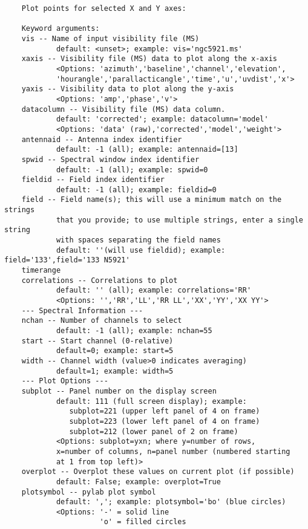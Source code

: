 \vspace{3mm}
\small
\begin{verbatim}
    Plot points for selected X and Y axes:
    
    Keyword arguments:
    vis -- Name of input visibility file (MS)
            default: <unset>; example: vis='ngc5921.ms'
    xaxis -- Visibility file (MS) data to plot along the x-axis
            <Options: 'azimuth','baseline','channel','elevation',
            'hourangle','parallacticangle','time','u','uvdist','x'>
    yaxis -- Visibility data to plot along the y-axis
            <Options: 'amp','phase','v'>
    datacolumn -- Visibility file (MS) data column.
            default: 'corrected'; example: datacolumn='model'
            <Options: 'data' (raw),'corrected','model','weight'>
    antennaid -- Antenna index identifier
            default: -1 (all); example: antennaid=[13]
    spwid -- Spectral window index identifier
            default: -1 (all); example: spwid=0
    fieldid -- Field index identifier
            default: -1 (all); example: fieldid=0
    field -- Field name(s); this will use a minimum match on the strings
            that you provide; to use multiple strings, enter a single string
            with spaces separating the field names
            default: ''(will use fieldid); example: field='133',field='133 N5921'
    timerange
    correlations -- Correlations to plot
            default: '' (all); example: correlations='RR'
            <Options: '','RR','LL','RR LL','XX','YY','XX YY'>
    --- Spectral Information ---
    nchan -- Number of channels to select
            default: -1 (all); example: nchan=55
    start -- Start channel (0-relative)
            default=0; example: start=5
    width -- Channel width (value>0 indicates averaging)
            default=1; example: width=5
    --- Plot Options ---
    subplot -- Panel number on the display screen
            default: 111 (full screen display); example:
               subplot=221 (upper left panel of 4 on frame)
               subplot=223 (lower left panel of 4 on frame)
               subplot=212 (lower panel of 2 on frame)
            <Options: subplot=yxn; where y=number of rows,
            x=number of columns, n=panel number (numbered starting
            at 1 from top left)>
    overplot -- Overplot these values on current plot (if possible)
            default: False; example: overplot=True
    plotsymbol -- pylab plot symbol
            default: ','; example: plotsymbol='bo' (blue circles)
            <Options: '-' = solid line
                      'o' = filled circles

\end{verbatim}
